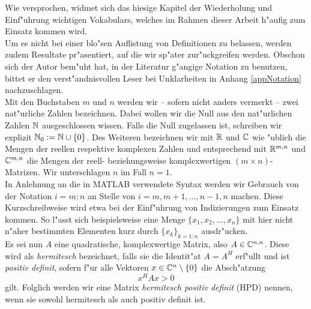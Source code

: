 Wie versprochen, widmet sich das hiesige Kapitel der Wiederholung und Einf"uhrung wichtigen Vokabulars, welches im Rahmen dieser Arbeit h"aufig zum Einsatz kommen wird.\\

Um es nicht bei einer blo"sen Auflistung von Definitionen zu belassen, werden zudem Resultate pr"asentiert, auf die wir sp"ater zur"uckgreifen werden.
Obschon sich der Autor bem"uht hat,
in der Literatur g"angige Notation zu benutzen, bittet er den
verst"andnisvollen Leser bei Unklarheiten in Anhang \ref{appNotation} nachzuschlagen.\\

Mit den Buchstaben $m$ und $n$ werden wir -- sofern nicht anders vermerkt -- zwei nat"urliche Zahlen bezeichnen. Dabei wollen wir die Null aus den nat"urlichen Zahlen $\mathbb{N}$ ausgeschlossen wissen.
Falls die Null zugelassen ist, schreiben wir explizit $\mathbb{N}_0 := \mathbb{N}\cup\{0\}$.
Des Weiteren bezeichnen wir mit $\mathbb{R}$ und $\mathbb{C}$ wie "ublich die Mengen der reellen respektive komplexen Zahlen und entsprechend mit $\mathbb{R}^{m,n}$ und $\mathbb{C}^{m,n}$ die Mengen der reell- beziehungsweise komplexwertigen $(m\times n)$-Matrizen. Wir unterschlagen $n$ im Fall $n=1$.\\

In Anlehnung an die in MATLAB verwendete Syntax werden wir Gebrauch von der Notation $i=m:n$ an Stelle von $i=m,m+1,\ldots,n-1,n$ machen.
Diese Kurzschreibweise wird etwa bei der Einf"uhrung von Indizierungen zum Einsatz kommen.
So l"asst sich beispielsweise eine Menge $\{x_1,x_2,\ldots,x_n\}$ mit hier nicht n"aher bestimmten Elementen kurz durch $\{x_k\}_{k=1:n}$ ausdr"ucken.\\

Es sei nun $A$ eine quadratische, komplexwertige Matrix, also $A\in\mathbb{C}^{n,n}$. Diese wird als \emph{hermitesch} bezeichnet, falls sie die Identit"at $A=A^H$ erf"ullt und ist \emph{positiv definit}, sofern
f"ur alle Vektoren $x\in\mathbb{C}^n \setminus\{0\}$ die Absch"atzung
\[
x^H A x > 0
\]
gilt. Folglich werden wir eine Matrix \emph{hermitesch positiv definit} (HPD)
nennen, wenn sie sowohl hermitesch als auch positiv definit ist.

\newpage


